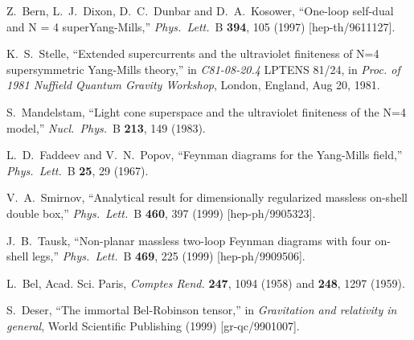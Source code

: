 \begin{thebibliography}{99}
Z.~Bern, L.~J.~Dixon, D.~C.~Dunbar and D.~A.~Kosower,
``One-loop self-dual and N = 4 superYang-Mills,''
{\it Phys.\ Lett.}\ B {\bf 394}, 105 (1997)
[hep-th/9611127].

K.~S.~Stelle, ``Extended supercurrents and the
ultraviolet finiteness of N=4 supersymmetric Yang-Mills theory,'' in
{\it C81-08-20.4} LPTENS 81/24,  in {\it Proc. of 1981 Nuffield Quantum
Gravity Workshop}, London, England, Aug 20, 1981.

S.~Mandelstam,
``Light cone superspace and the ultraviolet finiteness of the N=4 model,''
{\it Nucl.\ Phys.}\ B {\bf 213}, 149 (1983).

L.~D.~Faddeev and V.~N.~Popov,
``Feynman diagrams for the Yang-Mills field,''
{\it Phys.\ Lett.}\ B {\bf 25}, 29 (1967).

V.~A.~Smirnov,
``Analytical result for dimensionally regularized massless on-shell  
 double box,''
{\it Phys.\ Lett.}\ B {\bf 460}, 397 (1999)
[hep-ph/9905323].

J.~B.~Tausk,
``Non-planar massless two-loop Feynman diagrams with four on-shell legs,''
{\it Phys.\ Lett.}\ B {\bf 469}, 225 (1999)
[hep-ph/9909506].

L.\ Bel, Acad. Sci. Paris, {\it Comptes Rend.} {\bf 247}, 1094 (1958) 
and {\bf 248}, 1297 (1959).

S.~Deser,
``The immortal Bel-Robinson tensor,''
in {\it Gravitation and relativity in general}, World Scientific 
Publishing (1999)
[gr-qc/9901007].


\end{thebibliography}
